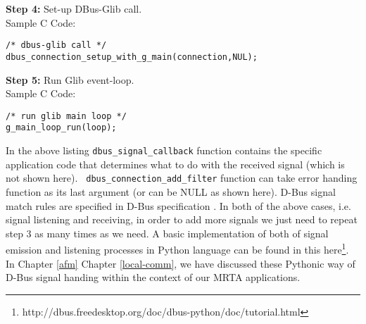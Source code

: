 \textbf{Step 4:} Set-up DBus-Glib call.\\
Sample C Code:
\begin{lstlisting} 
/* dbus-glib call */
dbus_connection_setup_with_g_main(connection,NUL);
\end{lstlisting} 
\textbf{Step 5:} Run Glib event-loop.\\
Sample C Code:
\begin{lstlisting} 
/* run glib main loop */
g_main_loop_run(loop);
\end{lstlisting} 
In the above listing \texttt{dbus\_signal\_callback} function contains the specific application code that determines what to do with the received signal (which is not shown here). \texttt{ dbus\_connection\_add\_filter} function can take error handing function as its last argument (or can be NULL as shown here). D-Bus signal match rules are specified in D-Bus specification \cite{Pennington+2010}. In both of the above cases, i.e. signal listening and receiving, in order to add more signals we just need to repeat step 3  as many times as we need. A basic implementation of both of signal emission and listening processes in Python language can be found in this here\footnote{http://dbus.freedesktop.org/doc/dbus-python/doc/tutorial.html}. In Chapter \ref{afm} Chapter \ref{local-comm}, we have discussed these Pythonic way of D-Bus signal handing within the context of our MRTA applications.